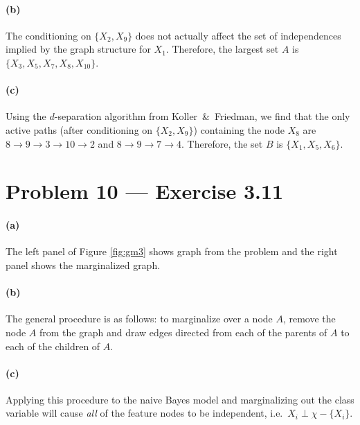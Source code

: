 \documentclass[11pt]{article}
\newcommand{\fig}[1]{Figure \ref{fig:#1}}
\begin{document}
\paragraph{(b)}

The conditioning on $\{ X_2, X_9 \}$ does not actually affect the set of
independences implied by the graph structure for $X_1$.  Therefore, the
largest set $A$ is $\{ X_3, X_5, X_7, X_8, X_{10} \}$.

\paragraph{(c)}

Using the $d$-separation algorithm from Koller~\&~Friedman, we find that the
only active paths (after conditioning on $\{ X_2, X_9 \}$) containing the node
$X_8$ are $8 \to 9 \to 3 \to 10 \to 2$ and $8 \to 9 \to 7 \to 4$.  Therefore,
the set $B$ is $\{ X_1, X_5, X_6 \}$.

\section{Problem 10 --- Exercise 3.11}

\paragraph{(a)}

The left panel of \fig{gm3} shows graph from the problem and the right
panel shows the marginalized graph.

\paragraph{(b)}

The general procedure is as follows: to marginalize over a node $A$,
remove the node $A$ from the graph and draw edges directed from each
of the parents of $A$ to each of the children of $A$.

\paragraph{(c)}

Applying this procedure to the naive Bayes model and marginalizing
out the class variable will cause \emph{all} of the feature nodes to be
independent, i.e.~$X_i \perp \chi - \{ X_i \}$.
\end{document}
